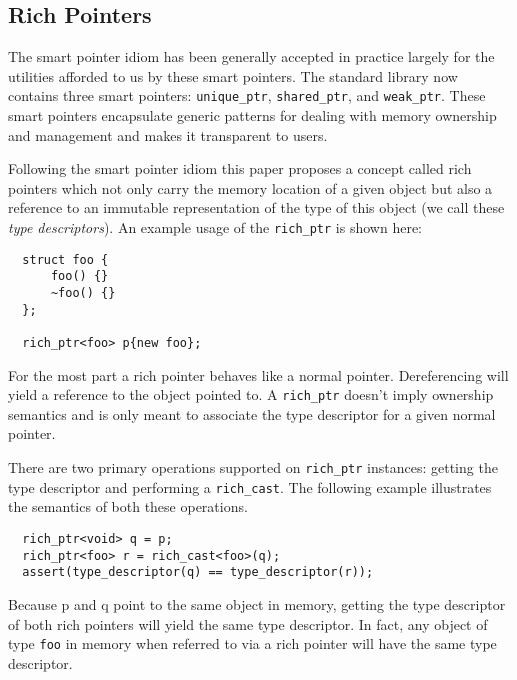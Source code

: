 \subsection{Rich Pointers}

The smart pointer idiom has been generally accepted in practice largely for
the utilities afforded to us by these smart pointers. The standard library now
contains three smart pointers: \verb+unique_ptr+, \verb+shared_ptr+, and
\verb+weak_ptr+. These smart pointers encapsulate generic patterns for dealing
with memory ownership and management and makes it transparent to users.

Following the smart pointer idiom this paper proposes a concept called rich
pointers which not only carry the memory location of a given object but also a
reference to an immutable representation of the type of this object (we call
these \emph{type descriptors}). An example usage of the \verb+rich_ptr+ is shown
here:

\begin{verbatim}
  struct foo {
      foo() {}
      ~foo() {}
  };

  rich_ptr<foo> p{new foo};
\end{verbatim}

For the most part a rich pointer behaves like a normal pointer. Dereferencing
will yield a reference to the object pointed to. A \verb+rich_ptr+ doesn't
imply ownership semantics and is only meant to associate the type descriptor
for a given normal pointer.

There are two primary operations supported on \verb+rich_ptr+ instances:
getting the type descriptor and performing a \verb+rich_cast+. The following
example illustrates the semantics of both these operations.

\begin{verbatim}
  rich_ptr<void> q = p;
  rich_ptr<foo> r = rich_cast<foo>(q);
  assert(type_descriptor(q) == type_descriptor(r));
\end{verbatim}

Because p and q point to the same object in memory, getting the type
descriptor of both rich pointers will yield the same type descriptor. In fact,
any object of type \verb+foo+ in memory when referred to via a rich pointer
will have the same type descriptor.